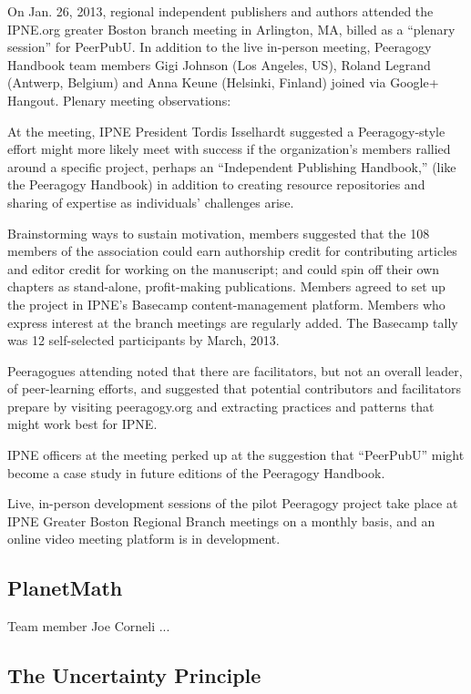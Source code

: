\documentclass{acm_proc_article-sp}
\begin{document}
On Jan. 26, 2013, regional independent publishers and authors attended
the IPNE.org greater Boston branch meeting in Arlington, MA, billed as
a ``plenary session'' for PeerPubU. In addition to the live in-person
meeting, Peeragogy Handbook team members Gigi Johnson (Los Angeles,
US), Roland Legrand (Antwerp, Belgium) and Anna Keune (Helsinki,
Finland) joined via Google+ Hangout.  Plenary meeting observations:

At the meeting, IPNE President Tordis Isselhardt suggested a
Peeragogy-style effort might more likely meet with success if the
organization's members rallied around a specific project, perhaps an
``Independent Publishing Handbook,'' (like the Peeragogy Handbook) in
addition to creating resource repositories and sharing of expertise as
individuals' challenges arise.

Brainstorming ways to sustain motivation, members suggested that the
108 members of the association could earn authorship credit for
contributing articles and editor credit for working on the manuscript;
and could spin off their own chapters as stand-alone, profit-making
publications.  Members agreed to set up the project in IPNE's Basecamp
content-management platform. Members who express interest at the
branch meetings are regularly added. The Basecamp tally was 12
self-selected participants by March, 2013.

Peeragogues attending noted that there are facilitators, but not an
overall leader, of peer-learning efforts, and suggested that potential
contributors and facilitators prepare by visiting peeragogy.org and
extracting practices and patterns that might work best for IPNE.

IPNE officers at the meeting perked up at the suggestion that
``PeerPubU'' might become a case study in future editions of the
Peeragogy Handbook.

Live, in-person development sessions of the pilot Peeragogy project
take place at IPNE Greater Boston Regional Branch meetings on a
monthly basis, and an online video meeting platform is in development.

\subsection{PlanetMath}

Team member Joe Corneli ...

\subsection{The Uncertainty Principle}
\end{document}
